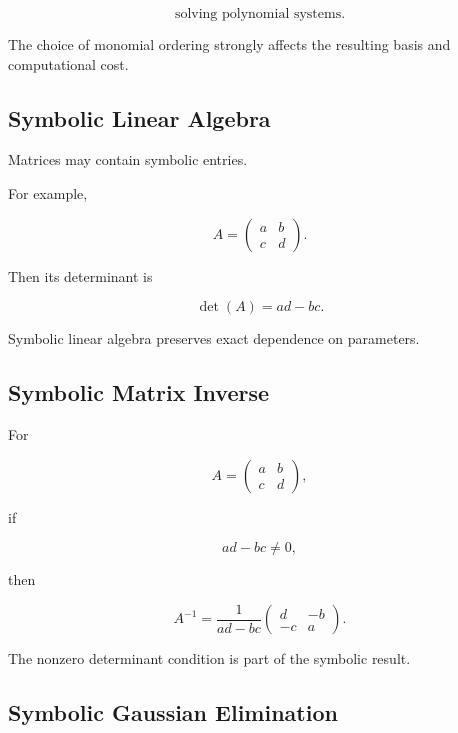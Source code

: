 \[
\boxed{
\text{solving polynomial systems}.
}
\]

The choice of monomial ordering strongly affects the resulting basis and
computational cost.

\subsection{Symbolic Linear Algebra}
\label{subsec:symbolic-linear-algebra}

Matrices may contain symbolic entries.

For example,

\[
\boxed{
A
=
\begin{pmatrix}
a&b\\
c&d
\end{pmatrix}.
}
\]

Then its determinant is

\[
\boxed{
\det(A)
=
ad-bc.
}
\]

Symbolic linear algebra preserves exact dependence on parameters.

\subsection{Symbolic Matrix Inverse}
\label{subsec:symbolic-matrix-inverse}

For

\[
A
=
\begin{pmatrix}
a&b\\
c&d
\end{pmatrix},
\]

if

\[
ad-bc\neq0,
\]

then

\[
\boxed{
A^{-1}
=
\frac1{ad-bc}
\begin{pmatrix}
d&-b\\
-c&a
\end{pmatrix}.
}
\]

The nonzero determinant condition is part of the symbolic result.

\subsection{Symbolic Gaussian Elimination}
\label{subsec:symbolic-gaussian-elimination}

